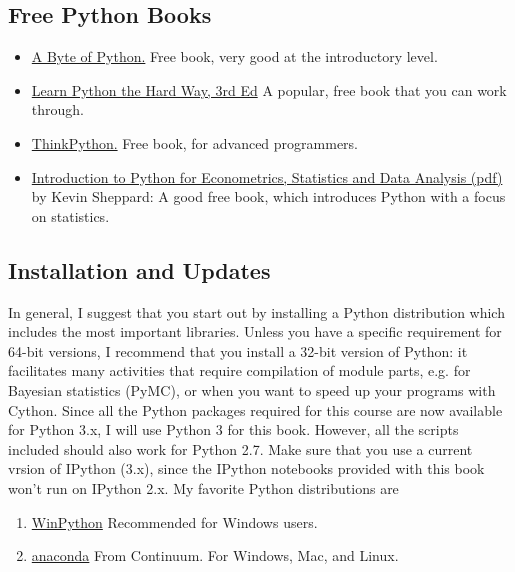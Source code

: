 \subsection{Free Python Books}

\begin{itemize}
  \item \href{http://swaroopch.com/notes/python}{A Byte of Python.} Free book, very good at the introductory level.
  \item \href{http://learnpythonthehardway.org/book/}{Learn Python the Hard Way, 3rd Ed} A popular, free book that you can work through.
  \item \href{http://www.greenteapress.com/thinkpython}{ThinkPython.} Free book, for advanced programmers.
  \item \href{http://www.kevinsheppard.com/images/0/09/Python_introduction.pdf}{Introduction to
      Python for Econometrics, Statistics and Data Analysis (pdf)} by Kevin Sheppard: A
      good free book, which introduces Python with a focus on statistics.
\end{itemize}

\subsection{Installation and Updates}

In general, I suggest that you start out by installing a Python distribution which includes the most important libraries. Unless you have a specific requirement for 64-bit versions, I recommend that you install a 32-bit version of Python: it facilitates many activities that require compilation of module parts, e.g. for Bayesian statistics (PyMC), or when you want to speed up your programs with Cython. Since all the Python packages required for this course are now available for Python 3.x, I will use Python 3 for this book. However, all the scripts included should also work for Python 2.7. Make sure that you use a current vrsion of IPython (3.x), since the IPython notebooks provided with this book won't run on IPython 2.x. My favorite Python distributions  are

\begin{enumerate}
    \item \href{https://winpython.github.io/}{WinPython} Recommended for Windows users.
    \item \href{https://store.continuum.io/cshop/anaconda/}{anaconda} From Continuum. For Windows, Mac, and Linux.
\end{enumerate}

